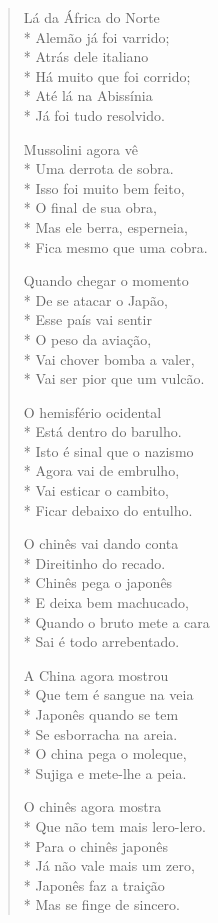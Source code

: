 \begin{verse}
Lá da África do Norte\\*
Alemão já foi varrido;\\*
Atrás dele italiano\\*
Há muito que foi corrido;\\*
Até lá na Abissínia\\*
Já foi tudo resolvido.

Mussolini agora vê\\*
Uma derrota de sobra.\\*
Isso foi muito bem feito,\\*
O final de sua obra,\\*
Mas ele berra, esperneia,\\*
Fica mesmo que uma cobra.

Quando chegar o momento\\*
De se atacar o Japão,\\*
Esse país vai sentir\\*
O peso da aviação,\\*
Vai chover bomba a valer,\\*
Vai ser pior que um vulcão.

O hemisfério ocidental\\*
Está dentro do barulho.\\*
Isto é sinal que o nazismo\\*
Agora vai de embrulho,\\*
Vai esticar o cambito,\\*
Ficar debaixo do entulho.

O chinês vai dando conta\\*
Direitinho do recado.\\*
Chinês pega o japonês\\*
E deixa bem machucado,\\*
Quando o bruto mete a cara\\*
Sai é todo arrebentado.

A China agora mostrou\\*
Que tem é sangue na veia\\*
Japonês quando se tem\\*
Se esborracha na areia.\\*
O china pega o moleque,\\*
Sujiga e mete-lhe a peia.

O chinês agora mostra\\*
Que não tem mais lero-lero.\\*
Para o chinês japonês\\*
Já não vale mais um zero,\\*
Japonês faz a traição\\*
Mas se finge de sincero.


\end{verse}
